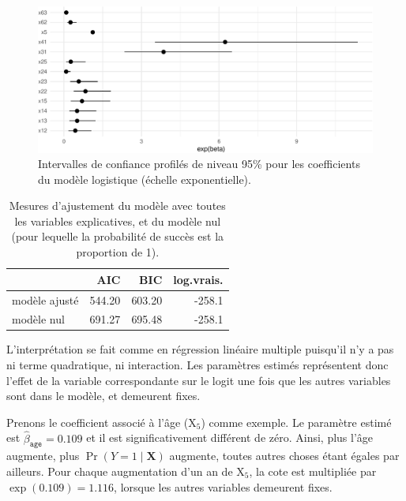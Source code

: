 \documentclass[
  11pt,
  letterpaper,
]{scrbook}
\theoremstyle{definition}
\theoremstyle{remark}
\begin{document}
\begin{figure}[ht!]

{\centering \includegraphics[width=1\textwidth,height=\textheight]{./05-reglogistique_files/figure-pdf/fig-confint-modele2-logist-1.pdf}

}

\caption{\label{fig-confint-modele2-logist}Intervalles de confiance
profilés de niveau 95\% pour les coefficients du modèle logistique
(échelle exponentielle).}

\end{figure}

\hypertarget{tbl-gof-logist1}{}
\begin{table}
\caption{\label{tbl-gof-logist1}Mesures d'ajustement du modèle avec toutes les variables explicatives,
et du modèle nul (pour lequelle la probabilité de succès est la
proportion de 1). }\tabularnewline

\centering
\begin{tabular}{lrrr}
\toprule
  & AIC & BIC & log.vrais.\\
\midrule
modèle ajusté & 544.20 & 603.20 & -258.1\\
modèle nul & 691.27 & 695.48 & -258.1\\
\bottomrule
\end{tabular}
\end{table}

L'interprétation se fait comme en régression linéaire multiple puisqu'il
n'y a pas ni terme quadratique, ni interaction. Les paramètres estimés
représentent donc l'effet de la variable correspondante sur le logit une
fois que les autres variables sont dans le modèle, et demeurent fixes.

Prenons le coefficient associé à l'âge (\(\mathrm{X}_5\)) comme exemple.
Le paramètre estimé est \(\widehat{\beta}_{\texttt{age}}=0.109\) et il
est significativement différent de zéro. Ainsi, plus l'âge augmente,
plus \(\Pr(Y=1\mid \mathbf{X})\) augmente, toutes autres choses étant
égales par ailleurs. Pour chaque augmentation d'un an de
\(\mathrm{X}_5\), la cote est multipliée par \(\exp(0.109)=1.116\),
lorsque les autres variables demeurent fixes.
\end{document}
